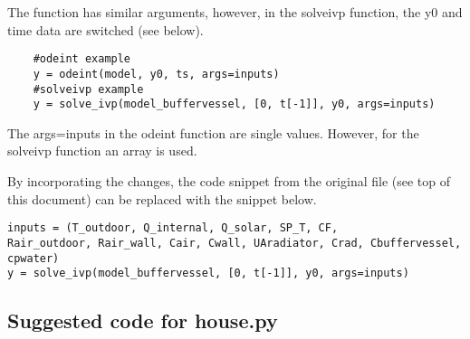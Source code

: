 The function has similar arguments, however, in the solveivp function, the y0 and time data are switched (see below).


\begin{lstlisting}
	#odeint example
	y = odeint(model, y0, ts, args=inputs)
	#solveivp example
	y = solve_ivp(model_buffervessel, [0, t[-1]], y0, args=inputs)
\end{lstlisting}

The args=inputs in the odeint function are single values. However, for the solveivp function an array is used.

By incorporating the changes, the code snippet from the original file (see top of this document) can be replaced with the snippet below.

\begin{lstlisting}
inputs = (T_outdoor, Q_internal, Q_solar, SP_T, CF,
Rair_outdoor, Rair_wall, Cair, Cwall, UAradiator, Crad, Cbuffervessel, cpwater)
y = solve_ivp(model_buffervessel, [0, t[-1]], y0, args=inputs)
\end{lstlisting}

\subsection{Suggested code for house.py}
